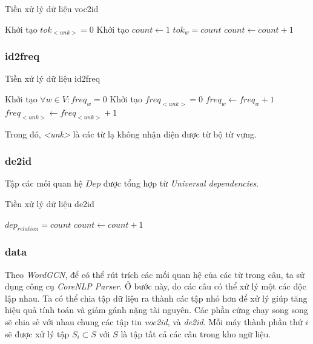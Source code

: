 \begin{algorithm}[H]
    \caption{Tiền xử lý dữ liệu voc2id}
    \begin{algorithmic}[1]
		\State Khởi tạo $tok_{<unk>} = 0$
		\State Khởi tạo $count \gets 1$
			\State $tok_{w} = count$
			\State $count \gets count + 1$
		\EndFor
    \end{algorithmic}
\end{algorithm}

\subsubsection{id2freq}

\begin{algorithm}[H]
    \caption{Tiền xử lý dữ liệu id2freq}
    \begin{algorithmic}[1]
		\State Khởi tạo $\forall w \in V : freq_w = 0$
		\State Khởi tạo $freq_{<unk>} = 0$
				\State $freq_{w} \gets freq_{w} + 1$
			\Else 
				\State $freq_{<unk>} \gets freq_{<unk>} + 1$
			\EndIf
		\EndFor
    \end{algorithmic}
\end{algorithm}

Trong đó, \textit{<unk>} là các từ lạ không nhận diện được từ bộ từ vựng.

\subsubsection{de2id}

Tập các mối quan hệ $Dep$ được tổng hợp từ \textit{Universal dependencies}.

\begin{algorithm}[H]
    \caption{Tiền xử lý dữ liệu de2id}
    \begin{algorithmic}[1]
			\State $dep_{relation} = count$
			\State $count \gets count + 1$
		\EndFor
    \end{algorithmic}
\end{algorithm}

\subsubsection{data}

Theo \textit{WordGCN}, để có thể rút trích các mối quan hệ của các từ trong câu, ta sử dụng công cụ \textit{CoreNLP Parser}. Ở bước này, do các câu có thể xử lý một các độc lập nhau. Ta có thể chia tập dữ liệu ra thành các tập nhỏ hơn để xử lý giúp tăng hiệu quả tính toán và giảm gánh nặng tài nguyên. Các phần cứng chạy song song sẽ chia sẻ với nhau chung các tập tin \textit{voc2id}, và \textit{de2id}. Mỗi máy thành phần thứ $i$ sẽ được xử lý tập $S_i \subset S$ với $S$ là tập tất cả các câu trong kho ngữ liệu.


